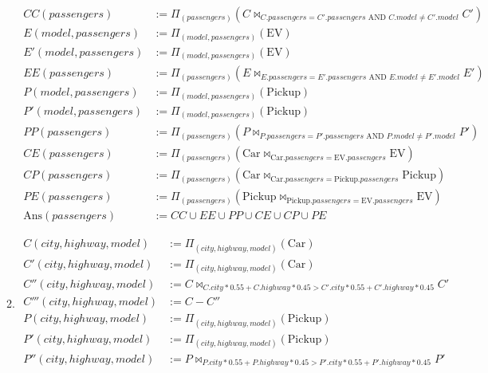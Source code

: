 \documentclass[12pt,letterpaper]{article}
\newcommand{\parens}[1]{\left(#1\right)}
\newcommand{\Ans}[0]{\text{Ans}}
\newcommand{\Car}[0]{\text{Car}}
\newcommand{\EV}[0]{\text{EV}}
\newcommand{\Pickup}[0]{\text{Pickup}}
\newcommand{\AND}[0]{\text{ AND }}
\begin{document}
\begin{enumerate}
\begin{enumerate}
\begin{align*}
            CC(passengers) &:= \Pi_{\parens{passengers}}\parens{C \bowtie_{C.passengers = C'.passengers \AND C.model \ne C'.model} C'} \\
            E(model, passengers) &:= \Pi_{\parens{model, passengers}}\parens{\EV} \\
            E'(model, passengers) &:= \Pi_{\parens{model, passengers}}\parens{\EV} \\
            EE(passengers) &:= \Pi_{\parens{passengers}}\parens{E \bowtie_{E.passengers = E'.passengers \AND E.model \ne E'.model} E'} \\
            P(model, passengers) &:= \Pi_{\parens{model, passengers}}\parens{\Pickup} \\
            P'(model, passengers) &:= \Pi_{\parens{model, passengers}}\parens{\Pickup} \\
            PP(passengers) &:= \Pi_{\parens{passengers}}\parens{P \bowtie_{P.passengers = P'.passengers \AND P.model \ne P'.model} P'} \\
            CE(passengers) &:= \Pi_{\parens{passengers}}\parens{\Car \bowtie_{\Car.passengers = \EV.passengers} \EV} \\
            CP(passengers) &:= \Pi_{\parens{passengers}}\parens{\Car \bowtie_{\Car.passengers = \Pickup.passengers} \Pickup} \\
            PE(passengers) &:= \Pi_{\parens{passengers}}\parens{\Pickup \bowtie_{\Pickup.passengers = \EV.passengers} \EV} \\
            \Ans(passengers) &:= CC \cup EE \cup PP \cup CE \cup CP \cup PE
          \end{align*}
        \item
          \begin{align*}
            C(city, highway, model) &:= \Pi_{\parens{city, highway, model}}\parens{\Car} \\
            C'(city, highway, model) &:= \Pi_{\parens{city, highway, model}}\parens{\Car} \\
            C''(city, highway, model) &:= C \bowtie_{C.city * 0.55 + C.highway * 0.45 > C'.city * 0.55 + C'.highway * 0.45} C' \\
            C'''(city, highway, model) &:= C - C'' \\
            P(city, highway, model) &:= \Pi_{\parens{city, highway, model}}\parens{\Pickup} \\
            P'(city, highway, model) &:= \Pi_{\parens{city, highway, model}}\parens{\Pickup} \\
            P''(city, highway, model) &:= P \bowtie_{P.city * 0.55 + P.highway * 0.45 > P'.city * 0.55 + P'.highway * 0.45} P' \\

\end{align*}
\end{enumerate}
\end{enumerate}
\end{document}
